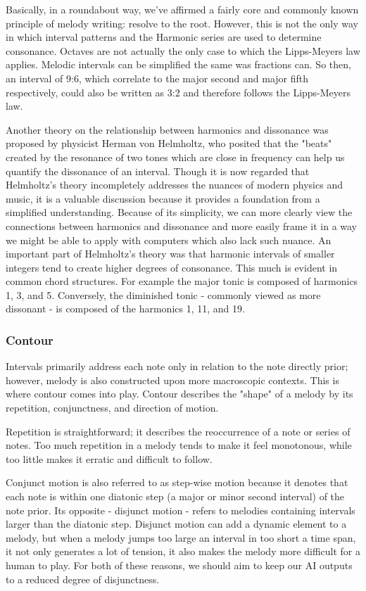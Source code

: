 Basically, in a roundabout way, we've affirmed a fairly core and commonly known principle of
melody writing: resolve to the root. However, this is not the only way in which interval patterns
and the Harmonic series are used to determine consonance. Octaves are not actually the only case to
which the Lipps-Meyers law applies. Melodic intervals can be simplified the same was fractions can.\autocite{intervals}
So then, an interval of 9:6, which correlate to the major second and major fifth respectively, could
also be written as 3:2 and therefore follows the Lipps-Meyers law.

Another theory on the relationship between harmonics and dissonance was proposed by physicist
Herman von Helmholtz, who posited that the "beats" created by the resonance of two tones which are
close in frequency can help us quantify the dissonance of an interval.\autocite{intervals} Though it is now regarded
that Helmholtz's theory incompletely addresses the nuances of modern physics and music, it is
a valuable discussion because it provides a foundation from a simplified understanding. Because
of its simplicity, we can more clearly view the connections between harmonics and dissonance and
more easily frame it in a way we might be able to apply with computers which also lack such nuance.
An important part of Helmholtz's theory was that harmonic intervals of smaller integers tend to
create higher degrees of consonance.\autocite{intervals} This much is evident in common chord
structures. For example the major tonic is composed of harmonics 1, 3, and 5. Conversely, the
diminished tonic - commonly viewed as more dissonant - is composed of the harmonics 1, 11, and 19.

\subsubsection{Contour}

Intervals primarily address each note only in relation to the note directly prior; however, melody
is also constructed upon more macroscopic contexts. This is where contour comes into play. Contour
describes the "shape" of a melody by its repetition, conjunctness, and direction of motion.\autocite{contour}

Repetition is straightforward; it describes the reoccurrence of a note or series of notes. Too much
repetition in a melody tends to make it feel monotonous, while too little makes it erratic and
difficult to follow.\autocite{contour}

Conjunct motion is also referred to as step-wise motion because it denotes that each note is within
one diatonic step (a major or minor second interval) of the note prior. Its opposite - disjunct
motion - refers to melodies containing intervals larger than the diatonic step. Disjunct motion can
add a dynamic element to a melody, but when a melody jumps too large an interval in too short a
time span, it not only generates a lot of tension, it also makes the melody more difficult for a
human to play. For both of these reasons, we should aim to keep our AI outputs to a reduced degree
of disjunctness.\autocite{contour}

